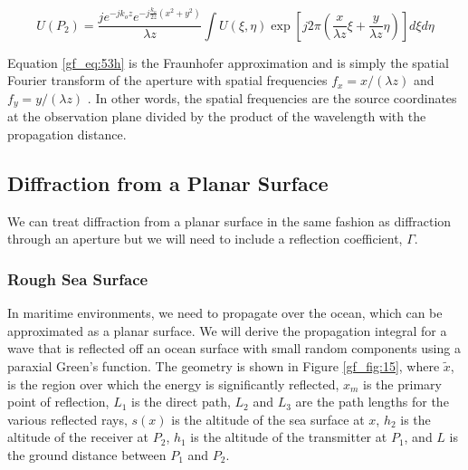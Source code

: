 \begin{equation}
\boxed{U(P_2) =\frac{je^{-jk_oz}e^{-j\frac{k_o}{2z}(x^2+y^2)}}{\lambda z}\int U(\xi,\eta)\exp\left[j2\pi\left(\frac{x}{\lambda z}\xi + \frac{y}{\lambda z}\eta \right) \right]d\xi d\eta}
\label{gf_eq:53h}
\end{equation}
\renewcommand{\baselinestretch}{2} \small\normalsize

Equation \ref{gf_eq:53h} is the Fraunhofer approximation and is simply the spatial Fourier transform of the aperture with spatial frequencies $f_x = x/(\lambda z)$ and $f_y = y/(\lambda z)$ \cite{goodman_fourier} \cite{gaskill_fourier}. In other words, the spatial frequencies are the source coordinates at the observation plane divided by the product of the wavelength with the propagation distance.

\subsection {Diffraction from a Planar Surface}
We can treat diffraction from a planar surface in the same fashion as diffraction through an aperture but we will need to include a reflection coefficient, $\Gamma$.

\subsubsection {Rough Sea Surface}
In maritime environments, we need to propagate over the ocean, which can be approximated as a planar surface. We will derive the propagation integral for a wave that is reflected off an ocean surface with small random components using a paraxial Green's function. The geometry is shown in Figure \ref{gf_fig:15}, where $\tilde{x}$, is the region over which the energy is significantly reflected, $x_m$ is the primary point of reflection, $L_1$ is the direct path, $L_2$ and $L_3$ are the path lengths for the various reflected rays, $s(x)$ is the altitude of the sea surface at $x$, $h_2$ is the altitude of the receiver at $P_2$, $h_1$ is the altitude of the transmitter at $P_1$, and $L$ is the ground distance between $P_1$ and $P_2$. 

